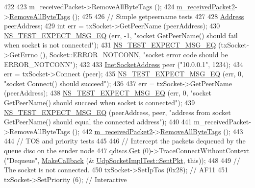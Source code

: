 \begin{DoxyCode}
422 
423   m\_receivedPacket->RemoveAllByteTags ();
424   \hyperlink{classUdpSocketImplTest_adc156ecabbea0886db6024dbda1e8088}{m\_receivedPacket2}->\hyperlink{classns3_1_1Packet_a083f54c9db31aeff30551a9e20fcda42}{RemoveAllByteTags} ();
425 
426   \textcolor{comment}{// Simple getpeername tests}
427 
428   \hyperlink{classns3_1_1Address}{Address} peerAddress;
429   \textcolor{keywordtype}{int} err = txSocket->GetPeerName (peerAddress);
430   \hyperlink{group__testing_ga7304ba46a28d8cf08dfdfd6499cf7068}{NS\_TEST\_EXPECT\_MSG\_EQ} (err, -1, \textcolor{stringliteral}{"socket GetPeerName() should fail when socket is not
       connected"});
431   \hyperlink{group__testing_ga7304ba46a28d8cf08dfdfd6499cf7068}{NS\_TEST\_EXPECT\_MSG\_EQ} (txSocket->GetErrno (), Socket::ERROR\_NOTCONN, \textcolor{stringliteral}{"socket error
       code should be ERROR\_NOTCONN"});
432 
433   \hyperlink{classns3_1_1InetSocketAddress}{InetSocketAddress} peer (\textcolor{stringliteral}{"10.0.0.1"}, 1234);
434   err = txSocket->Connect (peer);
435   \hyperlink{group__testing_ga7304ba46a28d8cf08dfdfd6499cf7068}{NS\_TEST\_EXPECT\_MSG\_EQ} (err, 0, \textcolor{stringliteral}{"socket Connect() should succeed"});
436 
437   err = txSocket->GetPeerName (peerAddress);
438   \hyperlink{group__testing_ga7304ba46a28d8cf08dfdfd6499cf7068}{NS\_TEST\_EXPECT\_MSG\_EQ} (err, 0, \textcolor{stringliteral}{"socket GetPeerName() should succeed when socket is
       connected"});
439   \hyperlink{group__testing_ga7304ba46a28d8cf08dfdfd6499cf7068}{NS\_TEST\_EXPECT\_MSG\_EQ} (peerAddress, peer, \textcolor{stringliteral}{"address from socket GetPeerName() should
       equal the connected address"});
440 
441   m\_receivedPacket->RemoveAllByteTags ();
442   \hyperlink{classUdpSocketImplTest_adc156ecabbea0886db6024dbda1e8088}{m\_receivedPacket2}->\hyperlink{classns3_1_1Packet_a083f54c9db31aeff30551a9e20fcda42}{RemoveAllByteTags} ();
443 
444   \textcolor{comment}{// TOS and priority tests}
445 
446   \textcolor{comment}{// Intercept the packets dequeued by the queue disc on the sender node}
447   qdiscs.\hyperlink{classns3_1_1QueueDiscContainer_a236064f6321b5f0d32561bb2a14e74af}{Get} (0)->TraceConnectWithoutContext (\textcolor{stringliteral}{"Dequeue"}, \hyperlink{group__makecallbackmemptr_ga9376283685aa99d204048d6a4b7610a4}{MakeCallback} (&
      \hyperlink{classUdpSocketImplTest_ad2c66c7cb086bbb4b6932becce0a01f7}{UdpSocketImplTest::SentPkt}, \textcolor{keyword}{this}));
448 
449   \textcolor{comment}{// The socket is not connected.}
450   txSocket->SetIpTos (0x28);  \textcolor{comment}{// AF11}
451   txSocket->SetPriority (6);  \textcolor{comment}{// Interactive}

\end{DoxyCode}
